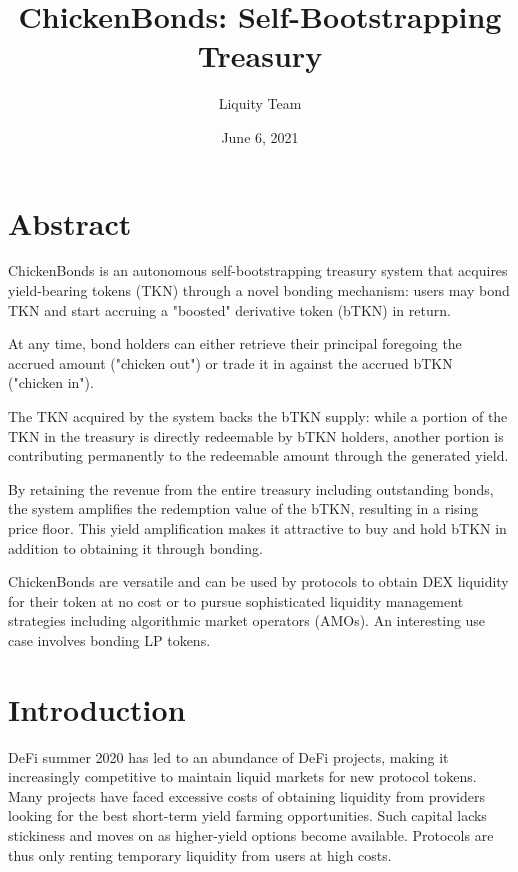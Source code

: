 \documentclass{article}
\begin{document}
\title{\textbf{ChickenBonds: Self-Bootstrapping Treasury}}
\author{Liquity Team}
\date{June 6, 2021}

\maketitle

\section*{Abstract}
ChickenBonds is an autonomous self-bootstrapping treasury system that acquires yield-bearing tokens (TKN) through a novel bonding mechanism: users may bond TKN and start accruing a "boosted" derivative token (bTKN) in return.

At any time, bond holders can either retrieve their principal foregoing the accrued amount ("chicken out") or trade it in against the accrued bTKN ("chicken in").

The TKN acquired by the system backs the bTKN supply: while a portion of the TKN in the treasury is directly redeemable by bTKN holders, another portion is contributing permanently to the redeemable amount through the generated yield.

By retaining the revenue from the entire treasury including outstanding bonds, the system amplifies the redemption value of the bTKN, resulting in a rising price floor. This yield amplification makes it attractive to buy and hold bTKN in addition to obtaining it through bonding. 

ChickenBonds are versatile and can be used by protocols to obtain DEX liquidity for their token at no cost or to pursue sophisticated liquidity management strategies including algorithmic market operators (AMOs). An interesting use case involves bonding LP tokens.

\tableofcontents

\section{Introduction}
DeFi summer 2020 has led to an abundance of DeFi projects, making it increasingly competitive to maintain liquid markets for new protocol tokens. Many projects have faced excessive costs of obtaining liquidity from providers looking for the best short-term yield farming opportunities. Such capital lacks stickiness and moves on as higher-yield options become available. Protocols are thus only renting temporary liquidity from users at high costs.
\end{document}
